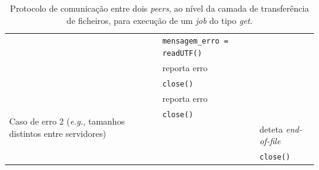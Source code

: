 \begin{table}[p]
\begin{tabularx}{\textwidth}{|p{2cm}|X|X|}
         & \verb|mensagem_erro = readUTF()| & \\
         & reporta erro & \\
         & \verb|close()| & \\
        \hline \multirow[t]{5}{=}{Caso de erro 2 (\emph{e.g.}, tamanhos distintos entre servidores)}
         & reporta erro & \\
         & \verb|close()| & \\
         & & deteta \emph{end-of-file} \\
         & & \verb|close()| \\
        \hline
    \end{tabularx}
    \caption{Protocolo de comunicação entre dois \emph{peers}, ao nível da camada de transferência de ficheiros, para execução de um \emph{job} do tipo \emph{get}.}
    \label{tbl:impl:protocolo-get}
\end{table}

